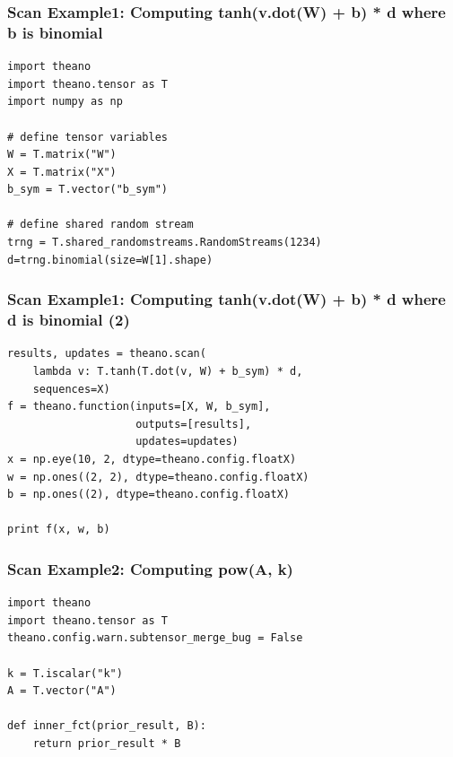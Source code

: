 \documentclass[utf8x,xcolor=pdftex,dvipsnames,table]{beamer}
\begin{document}
\begin{frame}
  \frametitle{Scan Example1: Computing tanh(v.dot(W) + b) * d where b is binomial}

\begin{lstlisting}
import theano
import theano.tensor as T
import numpy as np

# define tensor variables
W = T.matrix("W")
X = T.matrix("X")
b_sym = T.vector("b_sym")

# define shared random stream
trng = T.shared_randomstreams.RandomStreams(1234)
d=trng.binomial(size=W[1].shape)
\end{lstlisting}
\end{frame}


\begin{frame}[fragile]
  \frametitle{Scan Example1: Computing tanh(v.dot(W) + b) * d where d is binomial (2)}

\begin{lstlisting}
results, updates = theano.scan(
    lambda v: T.tanh(T.dot(v, W) + b_sym) * d,
    sequences=X)
f = theano.function(inputs=[X, W, b_sym],
                    outputs=[results],
                    updates=updates)
x = np.eye(10, 2, dtype=theano.config.floatX)
w = np.ones((2, 2), dtype=theano.config.floatX)
b = np.ones((2), dtype=theano.config.floatX)

print f(x, w, b)
\end{lstlisting}
\end{frame}

\begin{frame}[fragile]
  \frametitle{Scan Example2: Computing pow(A, k)}

\begin{lstlisting}
import theano
import theano.tensor as T
theano.config.warn.subtensor_merge_bug = False

k = T.iscalar("k")
A = T.vector("A")

def inner_fct(prior_result, B):
    return prior_result * B
\end{lstlisting}
\end{frame}
\end{document}
